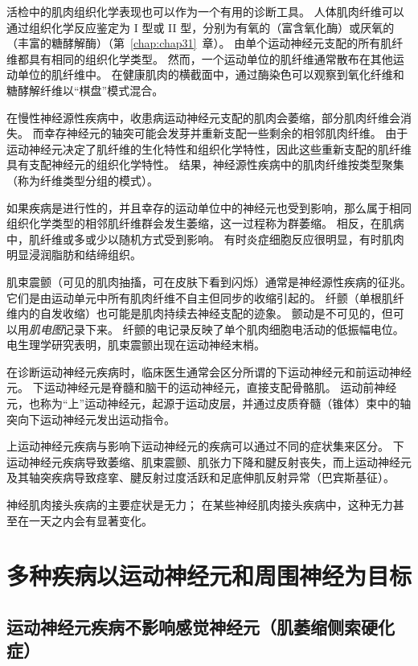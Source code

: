 活检中的肌肉组织化学表现也可以作为一个有用的诊断工具。
人体肌肉纤维可以通过组织化学反应鉴定为 I 型或 II 型，分别为有氧的（富含氧化酶）或厌氧的（丰富的糖酵解酶）（第~\ref{chap:chap31}~章）。
由单个运动神经元支配的所有肌纤维都具有相同的组织化学类型。
然而，一个运动单位的肌纤维通常散布在其他运动单位的肌纤维中。
在健康肌肉的横截面中，通过酶染色可以观察到氧化纤维和糖酵解纤维以“棋盘”模式混合。


在慢性神经源性疾病中，收患病运动神经元支配的肌肉会萎缩，部分肌肉纤维会消失。
而幸存神经元的轴突可能会发芽并重新支配一些剩余的相邻肌肉纤维。
由于运动神经元决定了肌纤维的生化特性和组织化学特性，因此这些重新支配的肌纤维具有支配神经元的组织化学特性。
结果，神经源性疾病中的肌肉纤维按类型聚集（称为纤维类型分组的模式）。


如果疾病是进行性的，并且幸存的运动单位中的神经元也受到影响，那么属于相同组织化学类型的相邻肌纤维群会发生萎缩，这一过程称为群萎缩。
相反，在肌病中，肌纤维或多或少以随机方式受到影响。
有时炎症细胞反应很明显，有时肌肉明显浸润脂肪和结缔组织。


肌束震颤（可见的肌肉抽搐，可在皮肤下看到闪烁）通常是神经源性疾病的征兆。
它们是由运动单元中所有肌肉纤维不自主但同步的收缩引起的。
纤颤（单根肌纤维内的自发收缩）也可能是肌肉持续去神经支配的迹象。
颤动是不可见的，但可以用\textit{肌电图}记录下来。
纤颤的电记录反映了单个肌肉细胞电活动的低振幅电位。
电生理学研究表明，肌束震颤出现在运动神经末梢。


在诊断运动神经元疾病时，临床医生通常会区分所谓的下运动神经元和前运动神经元。
下运动神经元是脊髓和脑干的运动神经元，直接支配骨骼肌。
运动前神经元，也称为“上”运动神经元，起源于运动皮层，并通过皮质脊髓（锥体）束中的轴突向下运动神经元发出运动指令。


上运动神经元疾病与影响下运动神经元的疾病可以通过不同的症状集来区分。
下运动神经元疾病导致萎缩、肌束震颤、肌张力下降和腱反射丧失，而上运动神经元及其轴突疾病导致痉挛、腱反射过度活跃和足底伸肌反射异常（巴宾斯基征）。


神经肌肉接头疾病的主要症状是无力；
在某些神经肌肉接头疾病中，这种无力甚至在一天之内会有显著变化。



\section{多种疾病以运动神经元和周围神经为目标}

\subsection{运动神经元疾病不影响感觉神经元（肌萎缩侧索硬化症）}

